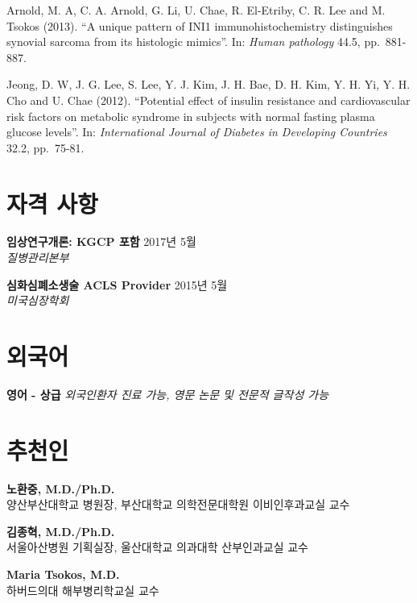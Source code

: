\documentclass[12pt,]{article}
\begin{document}
Arnold, M. A, C. A. Arnold, G. Li, U. Chae, R. El-Etriby, C. R. Lee and
M. Tsokos (2013). ``A unique pattern of INI1 immunohistochemistry
distinguishes synovial sarcoma from its histologic mimics''. In:
\emph{Human pathology} 44.5, pp.~881-887.

Jeong, D. W, J. G. Lee, S. Lee, Y. J. Kim, J. H. Bae, D. H. Kim, Y. H.
Yi, Y. H. Cho and U. Chae (2012). ``Potential effect of insulin
resistance and cardiovascular risk factors on metabolic syndrome in
subjects with normal fasting plasma glucose levels''. In:
\emph{International Journal of Diabetes in Developing Countries} 32.2,
pp.~75-81.

\section{자격 사항}\label{-}

\textbf{임상연구개론: KGCP 포함} \hfill 2017년 5월\\
\emph{질병관리본부}

\textbf{심화심폐소생술 ACLS Provider} \hfill 2015년 5월\\
\emph{미국심장학회}

\section{외국어}

\textbf{영어 - 상급} \emph{외국인환자 진료 가능, 영문 논문 및 전문적
글작성 가능}

\section{추천인}

\textbf{노환중, M.D./Ph.D.}\\
양산부산대학교 병원장, 부산대학교 의학전문대학원 이비인후과교실 교수

\textbf{김종혁, M.D./Ph.D.}\\
서울아산병원 기획실장, 울산대학교 의과대학 산부인과교실 교수

\textbf{Maria Tsokos, M.D.}\\
하버드의대 해부병리학교실 교수
\end{document}
